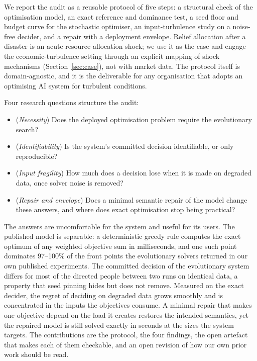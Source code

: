 \documentclass[systems,article,submit,moreauthors,pdftex]{Definitions/mdpi}
\begin{document}
We report the audit as a reusable protocol of five steps: a structural check of the
optimisation model, an exact reference and dominance test, a seed floor and budget curve
for the stochastic optimiser, an input-turbulence study on a noise-free decider, and a
repair with a deployment envelope. Relief allocation after a disaster is an acute
resource-allocation shock; we use it as the case and engage the economic-turbulence
setting through an explicit mapping of shock mechanisms (Section~\ref{sec:case}), not with
market data. The protocol itself is domain-agnostic, and it is the deliverable for any
organisation that adopts an optimising AI system for turbulent conditions.

Four research questions structure the audit:
\begin{itemize}
\item[RQ1] (\emph{Necessity}) Does the deployed optimisation problem require the
evolutionary search?
\item[RQ2] (\emph{Identifiability}) Is the system's committed decision identifiable, or
only reproducible?
\item[RQ3] (\emph{Input fragility}) How much does a decision lose when it is made on
degraded data, once solver noise is removed?
\item[RQ4] (\emph{Repair and envelope}) Does a minimal semantic repair of the model change
these answers, and where does exact optimisation stop being practical?
\end{itemize}

The answers are uncomfortable for the system and useful for its users. The published
model is separable: a deterministic greedy rule computes the exact optimum of any weighted
objective sum in milliseconds, and one such point dominates 97--100\% of the front points the
evolutionary solvers returned in our own published experiments. The committed
decision of the evolutionary system differs for most of the directed people between two
runs on identical data, a property that seed pinning hides but does not remove. Measured on
the exact decider, the regret of deciding on degraded data grows smoothly and is
concentrated in the inputs the objectives consume. A minimal repair that makes one
objective depend on the load it creates restores the intended semantics, yet the repaired
model is still solved exactly in seconds at the sizes the system targets. The contributions
are the protocol, the four findings, the open artefact that makes each of them checkable,
and an open revision of how our own prior work should be read.
\end{document}
